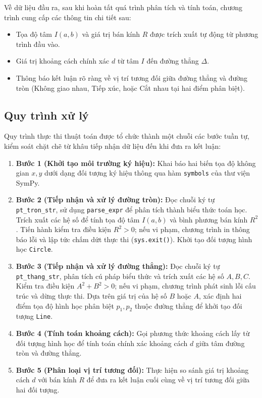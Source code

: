 \documentclass[12pt,a4paper]{article}
\begin{document}
Về dữ liệu đầu ra, sau khi hoàn tất quá trình phân tích và tính toán, chương trình cung cấp các thông tin chi tiết sau:
\begin{itemize}[leftmargin=*]
    \item Tọa độ tâm $I(a, b)$ và giá trị bán kính $R$ được trích xuất tự động từ phương trình đầu vào.
    \item Giá trị khoảng cách chính xác $d$ từ tâm $I$ đến đường thẳng $\Delta$.
    \item Thông báo kết luận rõ ràng về vị trí tương đối giữa đường thẳng và đường tròn (Không giao nhau, Tiếp xúc, hoặc Cắt nhau tại hai điểm phân biệt).
\end{itemize}

\subsection{Quy trình xử lý}
Quy trình thực thi thuật toán được tổ chức thành một chuỗi các bước tuần tự, kiểm soát chặt chẽ từ khâu tiếp nhận dữ liệu đến khi đưa ra kết luận:
\begin{enumerate}
    \item \textbf{Bước 1 (Khởi tạo môi trường ký hiệu):} Khai báo hai biến tọa độ không gian $x, y$ dưới dạng đối tượng ký hiệu thông qua hàm \texttt{symbols} của thư viện SymPy.
    \item \textbf{Bước 2 (Tiếp nhận và xử lý đường tròn):} Đọc chuỗi ký tự \texttt{pt\_tron\_str}, sử dụng \texttt{parse\_expr} để phân tích thành biểu thức toán học. Trích xuất các hệ số để tính tọa độ tâm $I(a, b)$ và bình phương bán kính $R^2$. Tiến hành kiểm tra điều kiện $R^2 > 0$; nếu vi phạm, chương trình in thông báo lỗi và lập tức chấm dứt thực thi (\texttt{sys.exit()}). Khởi tạo đối tượng hình học \texttt{Circle}.
    \item \textbf{Bước 3 (Tiếp nhận và xử lý đường thẳng):} Đọc chuỗi ký tự \texttt{pt\_thang\_str}, phân tích cú pháp biểu thức và trích xuất các hệ số $A, B, C$. Kiểm tra điều kiện $A^2 + B^2 > 0$; nếu vi phạm, chương trình phát sinh lỗi cấu trúc và dừng thực thi. Dựa trên giá trị của hệ số $B$ hoặc $A$, xác định hai điểm tọa độ hình học phân biệt $p_1, p_2$ thuộc đường thẳng để khởi tạo đối tượng \texttt{Line}.
    \item \textbf{Bước 4 (Tính toán khoảng cách):} Gọi phương thức khoảng cách lấy từ đối tượng hình học để tính toán chính xác khoảng cách $d$ giữa tâm đường tròn và đường thẳng.
    \item \textbf{Bước 5 (Phân loại vị trí tương đối):} Thực hiện so sánh giá trị khoảng cách $d$ với bán kính $R$ để đưa ra kết luận cuối cùng về vị trí tương đối giữa hai đối tượng.
\end{enumerate}
\end{document}
